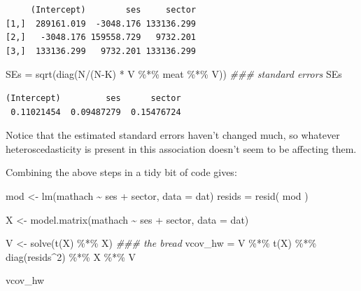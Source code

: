 \documentclass[
  letterpaper,
  DIV=11,
  numbers=noendperiod]{scrreprt}
\newenvironment{Shaded}{\begin{snugshade}}{\end{snugshade}}
\newcommand{\AttributeTok}[1]{\textcolor[rgb]{0.49,0.56,0.16}{#1}}
\newcommand{\DecValTok}[1]{\textcolor[rgb]{0.25,0.63,0.44}{#1}}
\newcommand{\DocumentationTok}[1]{\textcolor[rgb]{0.73,0.13,0.13}{\textit{#1}}}
\newcommand{\FunctionTok}[1]{\textcolor[rgb]{0.02,0.16,0.49}{#1}}
\newcommand{\NormalTok}[1]{\textcolor[rgb]{0.00,0.44,0.13}{#1}}
\newcommand{\OtherTok}[1]{\textcolor[rgb]{0.00,0.44,0.13}{#1}}
\newcommand{\SpecialCharTok}[1]{\textcolor[rgb]{0.25,0.44,0.63}{#1}}
\begin{document}
\begin{verbatim}
     (Intercept)        ses     sector
[1,]  289161.019  -3048.176 133136.299
[2,]   -3048.176 159558.729   9732.201
[3,]  133136.299   9732.201 133136.299
\end{verbatim}

\begin{Shaded}
\begin{Highlighting}[]
\NormalTok{SEs }\OtherTok{=} \FunctionTok{sqrt}\NormalTok{(}\FunctionTok{diag}\NormalTok{(N}\SpecialCharTok{/}\NormalTok{(N}\SpecialCharTok{{-}}\NormalTok{K) }\SpecialCharTok{*}\NormalTok{ V }\SpecialCharTok{\%*\%}\NormalTok{ meat }\SpecialCharTok{\%*\%}\NormalTok{ V)) }\DocumentationTok{\#\#\# standard errors}
\NormalTok{SEs}
\end{Highlighting}
\end{Shaded}

\begin{verbatim}
(Intercept)         ses      sector 
 0.11021454  0.09487279  0.15476724 
\end{verbatim}

Notice that the estimated standard errors haven't changed much, so
whatever heteroscedasticity is present in this association doesn't seem
to be affecting them.

Combining the above steps in a tidy bit of code gives:

\begin{Shaded}
\begin{Highlighting}[]
\NormalTok{mod }\OtherTok{\textless{}{-}} \FunctionTok{lm}\NormalTok{(mathach }\SpecialCharTok{\textasciitilde{}}\NormalTok{ ses }\SpecialCharTok{+}\NormalTok{ sector, }\AttributeTok{data =}\NormalTok{ dat)}
\NormalTok{resids }\OtherTok{=} \FunctionTok{resid}\NormalTok{( mod )}

\NormalTok{X }\OtherTok{\textless{}{-}} \FunctionTok{model.matrix}\NormalTok{(mathach }\SpecialCharTok{\textasciitilde{}}\NormalTok{ ses }\SpecialCharTok{+}\NormalTok{ sector, }\AttributeTok{data =}\NormalTok{ dat)}

\NormalTok{V }\OtherTok{\textless{}{-}} \FunctionTok{solve}\NormalTok{(}\FunctionTok{t}\NormalTok{(X) }\SpecialCharTok{\%*\%}\NormalTok{ X) }\DocumentationTok{\#\#\# the bread}
\NormalTok{vcov\_hw }\OtherTok{=}\NormalTok{ V }\SpecialCharTok{\%*\%} \FunctionTok{t}\NormalTok{(X) }\SpecialCharTok{\%*\%} \FunctionTok{diag}\NormalTok{(resids}\SpecialCharTok{\^{}}\DecValTok{2}\NormalTok{) }\SpecialCharTok{\%*\%}\NormalTok{ X }\SpecialCharTok{\%*\%}\NormalTok{ V}

\NormalTok{vcov\_hw}
\end{Highlighting}
\end{Shaded}
\end{document}
